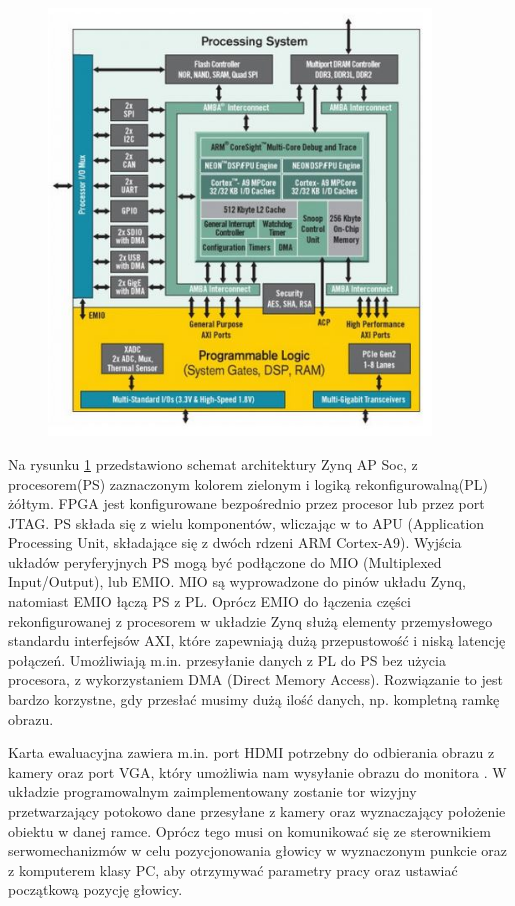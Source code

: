 \begin{figure}[h]
	\centering
	\includegraphics[width=4in]{zybo_scheme.jpg}
	\label{fig:zybo_scheme}
\end{figure}

Na rysunku \ref{fig:zybo_scheme} przedstawiono schemat architektury Zynq AP Soc, z procesorem(PS) zaznaczonym kolorem zielonym i logiką rekonfigurowalną(PL) żółtym. FPGA jest konfigurowane bezpośrednio przez procesor lub przez port JTAG. PS składa się z wielu komponentów, wliczając w to APU (Application Processing Unit, składające się z dwóch rdzeni ARM Cortex-A9). Wyjścia układów peryferyjnych PS mogą być podłączone do MIO (Multiplexed Input/Output), lub EMIO. MIO są wyprowadzone do pinów układu Zynq, natomiast EMIO łączą PS z PL. Oprócz EMIO do łączenia części rekonfigurowanej z procesorem w układzie Zynq służą elementy przemysłowego standardu interfejsów AXI, które zapewniają dużą przepustowość i niską latencję połączeń\cite{Zynq}. Umożliwiają m.in. przesyłanie danych z PL do PS bez użycia procesora, z wykorzystaniem DMA (Direct Memory Access). Rozwiązanie to jest bardzo korzystne, gdy przesłać musimy dużą ilość danych, np. kompletną ramkę obrazu.

Karta ewaluacyjna zawiera m.in. port HDMI potrzebny do odbierania obrazu z kamery oraz port VGA, który umożliwia nam wysyłanie obrazu do monitora \cite{Xi}.
W układzie programowalnym zaimplementowany zostanie tor wizyjny przetwarzający potokowo dane przesyłane z kamery oraz wyznaczający położenie obiektu w danej ramce.
Oprócz tego musi on komunikować się ze sterownikiem serwomechanizmów w celu pozycjonowania głowicy w wyznaczonym punkcie oraz z komputerem klasy PC, aby otrzymywać parametry pracy oraz ustawiać początkową pozycję głowicy.


